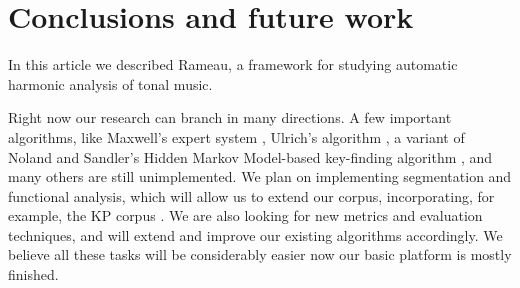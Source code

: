 \documentclass{article}
\begin{document}
\section{Conclusions and future work}
\label{sec:concl-future-work}

In this article we described Rameau, a framework for studying
automatic harmonic analysis of tonal music.

Right now our research can branch in many directions. A few important
algorithms, like Maxwell's expert system \cite{maxwell:expert},
Ulrich's algorithm \cite{ulrich:analysis}, a variant of Noland and
Sandler's Hidden Markov Model-based key-finding algorithm
\cite{noland.ea:key}, and many others are still unimplemented. We plan
on implementing segmentation and functional analysis, which will allow
us to extend our corpus, incorporating, for example, the KP corpus
\cite{temperley:bayesian}. We are also looking for new metrics and
evaluation techniques, and will extend and improve our existing
algorithms accordingly. We believe all these tasks will be
considerably easier now our basic platform is mostly finished.




\end{document}
